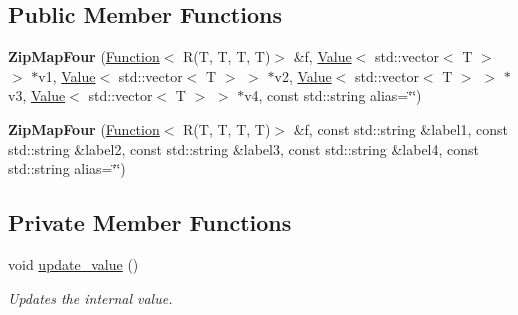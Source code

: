 \subsection*{Public Member Functions}
\begin{DoxyCompactItemize}
\item 
\hypertarget{classfv_1_1ZipMapFour_abe592d190561a6472f134c62ba124a0c}{}\label{classfv_1_1ZipMapFour_abe592d190561a6472f134c62ba124a0c} 
{\bfseries Zip\+Map\+Four} (\hyperlink{classfv_1_1Function}{Function}$<$ R(T, T, T, T)$>$ \&f, \hyperlink{classfv_1_1Value}{Value}$<$ std\+::vector$<$ T $>$ $>$ $\ast$v1, \hyperlink{classfv_1_1Value}{Value}$<$ std\+::vector$<$ T $>$ $>$ $\ast$v2, \hyperlink{classfv_1_1Value}{Value}$<$ std\+::vector$<$ T $>$ $>$ $\ast$v3, \hyperlink{classfv_1_1Value}{Value}$<$ std\+::vector$<$ T $>$ $>$ $\ast$v4, const std\+::string alias=\char`\"{}\char`\"{})
\item 
\hypertarget{classfv_1_1ZipMapFour_a5509c463af07fadc89c5b9e3af50956c}{}\label{classfv_1_1ZipMapFour_a5509c463af07fadc89c5b9e3af50956c} 
{\bfseries Zip\+Map\+Four} (\hyperlink{classfv_1_1Function}{Function}$<$ R(T, T, T, T)$>$ \&f, const std\+::string \&label1, const std\+::string \&label2, const std\+::string \&label3, const std\+::string \&label4, const std\+::string alias=\char`\"{}\char`\"{})
\end{DoxyCompactItemize}
\subsection*{Private Member Functions}
\begin{DoxyCompactItemize}
\item 
void \hyperlink{classfv_1_1ZipMapFour_a812747fdc043c776951ceb93a1085915}{update\+\_\+value} ()
\begin{DoxyCompactList}\small\item\em Updates the internal value. \end{DoxyCompactList}\end{DoxyCompactItemize}

